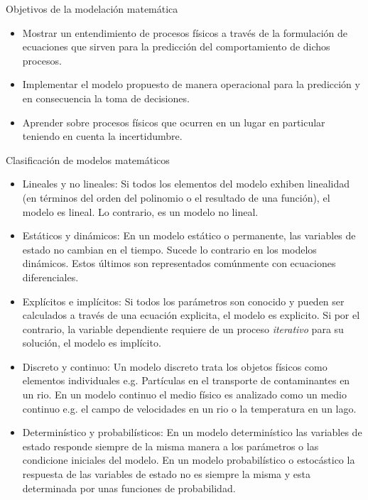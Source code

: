 \documentclass[
10pt,
aspectratio=169,
]{beamer}
\begin{document}
\begin{frame}{Objetivos de la modelaci\'on matemática}
\begin{itemize}
\item Mostrar un entendimiento de procesos físicos a trav\'es de la formulación de ecuaciones que sirven para la predicción del comportamiento de dichos procesos.
\item Implementar el modelo propuesto de manera operacional para la predicción y en consecuencia la toma de decisiones. 
\item Aprender sobre procesos físicos que ocurren en un lugar en particular teniendo en cuenta la incertidumbre.
\end{itemize}
\end{frame}


\begin{frame}{Clasificaci\'on de modelos matem\'aticos}
\begin{itemize}
\item \alert{Lineales y no lineales}: Si todos los elementos del modelo exhiben linealidad (en términos del orden del polinomio o el resultado de una función), el modelo es lineal. Lo contrario, es un modelo no lineal.
\item \alert{Estáticos y din\'amicos}: En un modelo estático o permanente, las variables de estado no cambian  en el tiempo. Sucede lo contrario en los modelos dinámicos. Estos últimos son representados comúnmente con ecuaciones diferenciales.
\item \alert{Explícitos e implícitos}: Si todos los parámetros son conocido y pueden ser calculados a través de una ecuación explicita, el modelo es explicito. Si por el contrario, la variable dependiente requiere de un proceso \emph{iterativo} para su solución, el modelo es implícito.
\item \alert{Discreto y continuo}: Un modelo discreto trata los objetos físicos como elementos individuales e.g. Partículas en el transporte de contaminantes en un rio. En un modelo continuo el medio físico  es analizado como un medio continuo e.g. el campo de velocidades en un rio o la temperatura en un lago. 
\item \alert{Determinístico y probabilísticos}: En un modelo determinístico las variables de estado responde siempre de la misma manera a los parámetros o las condicione iniciales del modelo. En un modelo probabilístico o estocástico la respuesta de las variables de estado no es siempre la misma y esta determinada por unas funciones de probabilidad. 
\end{itemize}
\end{frame}
\end{document}
